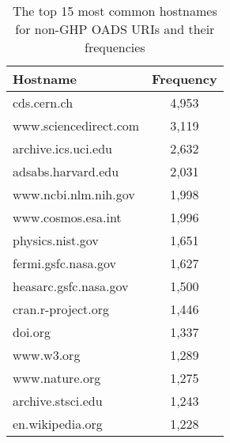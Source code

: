 \begin{table}
    \centering
    \begin{tabular}{|l|c|}
    \hline
    Hostname & Frequency \\
    \hline
    cds.cern.ch & 4,953 \\
    www.sciencedirect.com & 3,119 \\
    archive.ics.uci.edu & 2,632 \\
    adsabs.harvard.edu & 2,031 \\
    www.ncbi.nlm.nih.gov & 1,998 \\
    www.cosmos.esa.int & 1,996 \\
    physics.nist.gov & 1,651 \\
    fermi.gsfc.nasa.gov & 1,627 \\
    heasarc.gsfc.nasa.gov & 1,500 \\
    cran.r-project.org & 1,446 \\
    doi.org & 1,337 \\
    www.w3.org & 1,289 \\
    www.nature.org & 1,275 \\
    archive.stsci.edu & 1,243 \\
    en.wikipedia.org & 1,228 \\
    \hline
    \end{tabular}
    \caption{The top 15 most common hostnames for non-GHP OADS URIs and their frequencies}
    \label{tab:hostnames}
\end{table}